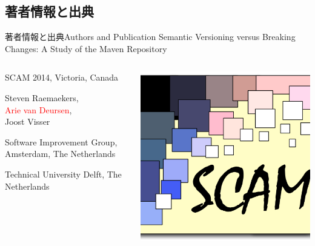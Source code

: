 \subsection{著者情報と出典}
\begin{frame}{著者情報と出典}{Authors and Publication}
{\large Semantic Versioning versus Breaking Changes:
A Study of the Maven Repository
}
\begin{columns}
\begin{column}{0.8\textwidth}
\begin{itemize}
\item[出典] SCAM 2014, Victoria, Canada
\item[著者] Steven Raemaekers\dag, \\ \textcolor{red}{Arie van Deursen}\ddag,\\ Joost Visser\dag
{\small
\item[\dag] Software Improvement Group, Amsterdam, The Netherlands
\item[\ddag] Technical University Delft, The Netherlands
}
\end{itemize}
\end{column}
\begin{column}{0.2\textwidth}
\includegraphics[width=\textwidth]{scamlogo}


\end{column}
\end{columns}
\end{frame}
